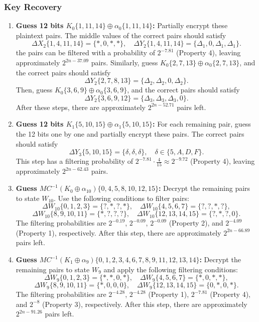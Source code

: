 \documentclass{article}
\begin{document}
\subsubsection{Key Recovery}

\begin{enumerate}
    \item \textbf{Guess 12 bits $K_0\{1, 11, 14\} \oplus \alpha_0\{1, 11, 14\}$:}  
    Partially encrypt these plaintext pairs. The middle values of the correct pairs should satisfy  
    \[
    \Delta X_2\{1, 4, 11, 14\} = \{\ast, 0, \ast, \ast\}, \quad \Delta Y_2\{1, 4, 11, 14\} = \{\Delta_1, 0, \Delta_1, \Delta_1\}.
    \]  
    the pairs can be filtered with a probability of $2^{-7.81}$ (Property 4), leaving approximately $2^{2n-37.09}$ pairs.  
    Similarly, guess $K_0\{2, 7, 13\} \oplus \alpha_0\{2, 7, 13\}$, and the correct pairs should satisfy  
    \[
    \Delta Y_2\{2, 7, 8, 13\} = \{\Delta_2, \Delta_2, 0, \Delta_2\}.
    \]  
    Then, guess $K_0\{3, 6, 9\} \oplus \alpha_0\{3, 6, 9\}$, and the correct pairs should satisfy  
    \[
    \Delta Y_2\{3, 6, 9, 12\} = \{\Delta_3, \Delta_3, \Delta_3, 0\}.
    \]  
    After these steps, there are approximately $2^{2n-52.71}$ pairs left.

    \item \textbf{Guess 12 bits $K_1\{5, 10, 15\} \oplus \alpha_1\{5, 10, 15\}$:}  
    For each remaining pair, guess the 12 bits one by one and partially encrypt these pairs. The correct pairs should satisfy  
    \[
    \Delta Y_3\{5, 10, 15\} = \{\delta, \delta, \delta\}, \quad \delta \in \{5, A, D, F\}.
    \]  
    This step has a filtering probability of $2^{-7.81} \cdot \frac{4}{15} \approx 2^{-9.72}$ (Property 4), leaving approximately $2^{2n-62.43}$ pairs.

    \item \textbf{Guess $MC^{-1}(K_0 \oplus \alpha_{10})\{0, 4, 5, 8, 10, 12, 15\}$:}  
    Decrypt the remaining pairs to state $W_{10}$. Use the following conditions to filter pairs:
    \[
    \Delta W_{10}\{0, 1, 2, 3\} = \{?, \ast, ?, \ast\}, \quad \Delta W_{10}\{4, 5, 6, 7\} = \{?, ?, \ast, ?\},
    \]
    \[
    \Delta W_{10}\{8, 9, 10, 11\} = \{\ast, ?, ?, ?\}, \quad \Delta W_{10}\{12, 13, 14, 15\} = \{?, \ast, ?, 0\}.
    \]  
    The filtering probabilities are $2^{-0.19}$, $2^{-0.09}$, $2^{-0.09}$ (Property 2), and $2^{-4.09}$ (Property 1), respectively. After this step, there are approximately $2^{2n-66.89}$ pairs left.

    \item \textbf{Guess $MC^{-1}(K_1 \oplus \alpha_9)\{0, 1, 2, 3, 4, 6, 7, 8, 9, 11, 12, 13, 14\}$:}  
    Decrypt the remaining pairs to state $W_9$ and apply the following filtering conditions:
    \[
    \Delta W_9\{0, 1, 2, 3\} = \{\ast, \ast, 0, \ast\}, \quad \Delta W_9\{4, 5, 6, 7\} = \{\ast, 0, \ast, \ast\},
    \]
    \[
    \Delta W_9\{8, 9, 10, 11\} = \{\ast, 0, 0, 0\}, \quad \Delta W_9\{12, 13, 14, 15\} = \{0, \ast, 0, \ast\}.
    \]  
    The filtering probabilities are $2^{-4.28}$, $2^{-4.28}$ (Property 1), $2^{-7.81}$ (Property 4), and $2^{-8}$ (Property 3), respectively. After this step, there are approximately $2^{2n-91.26}$ pairs left.


\end{enumerate}
\end{document}

